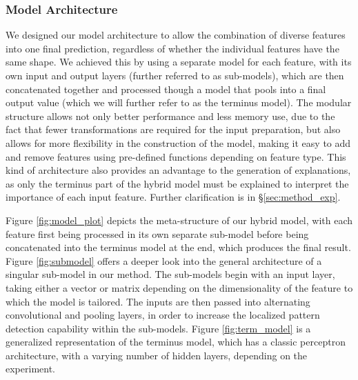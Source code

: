 \documentclass{article}
\begin{document}
			\subsubsection{Model Architecture}
			We designed our model architecture to allow the combination of diverse features into
			one final prediction, regardless of whether the individual features have the same
			shape. We achieved this by using a separate model for each feature, with its own input
			and output layers (further referred to as sub-models), which are then concatenated
			together and processed though a model that pools into a final output value (which we
			will further refer to as the terminus model). The modular structure allows not only
			better performance and less memory use, due to the fact that fewer transformations are
			required for the input preparation, but also allows for more flexibility in the
			construction of the model, making it easy to add and remove features using pre-defined
			functions depending on feature type. This kind of architecture also provides an
			advantage to the generation of explanations, as only the terminus part of the hybrid
			model must be explained to interpret the importance of each input feature. Further
			clarification is in §\ref{sec:method_exp}.
			\par
			Figure \ref{fig:model_plot} depicts the meta-structure of our hybrid model, with each
			feature first being processed in its own separate sub-model before being concatenated
			into the terminus model at the end, which produces the final result. Figure
			\ref{fig:submodel} offers a deeper look into the general architecture of a singular
			sub-model in our method. The sub-models begin with an input layer, taking either a
			vector or matrix depending on the dimensionality of the feature to which the model is
			tailored. The inputs are then passed into alternating convolutional and pooling
			layers, in order to increase the localized pattern detection capability within the
			sub-models. Figure \ref{fig:term_model} is a generalized representation of the
			terminus model, which has a classic perceptron architecture, with a varying number of
			hidden layers, depending on the experiment.
\end{document}
